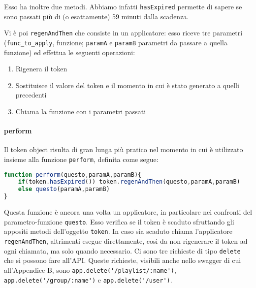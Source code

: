 Esso ha inoltre due metodi.
Abbiamo infatti \verb|hasExpired| permette di sapere se sono passati più di (o esattamente) 59 minuti dalla scadenza.


Vi è poi \verb|regenAndThen| che consiste in un applicatore: esso riceve tre parametri (\verb|func_to_apply|, funzione; \verb|paramA| e \verb|paramB| parametri da passare a quella funzione) ed effettua le seguenti operazioni:

\begin{enumerate}
    \item Rigenera il token
    \item Sostituisce il valore del token e il momento in cui è stato generato a quelli precedenti
    \item Chiama la funzione con i parametri passati
\end{enumerate}
\paragraph{perform} Il token object risulta di gran lunga più pratico nel momento in cui è utilizzato insieme alla funzione \verb|perform|, definita come segue:
\begin{lstlisting}[language=JavaScript]
function perform(questo,paramA,paramB){
    if(token.hasExpired()) token.regenAndThen(questo,paramA,paramB)
    else questo(paramA,paramB)
}
\end{lstlisting}
Questa funzione è ancora una volta un applicatore, in particolare nei confronti del parametro-funzione \verb|questo|. Esso verifica se il token è scaduto sfruttando gli appositi metodi dell'oggetto \verb|token|. In caso sia scaduto chiama l'applicatore \verb|regenAndThen|, altrimenti esegue direttamente, così da non rigenerare il token ad ogni chiamata, ma solo quando necessario.
Ci sono tre richieste di tipo \verb|delete| che si possono fare all'API. Queste richieste, visibili anche nello swagger di cui all'Appendice B, sono \verb|app.delete('/playlist/:name')|, \verb|app.delete('/group/:name')| e \verb|app.delete('/user')|.

